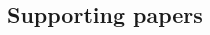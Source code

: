 \documentclass[11pt,twoside,openright]{memoir}
\begin{document}
\begin{CJK*}{UTF8}{gbsn}






%


\glsaddall

\printglossary[style=list, type=\acronymtype, title=Acronyms]
\printglossary


\printbibliography


\part{Supporting papers}

 







\end{CJK*}
\end{document}
